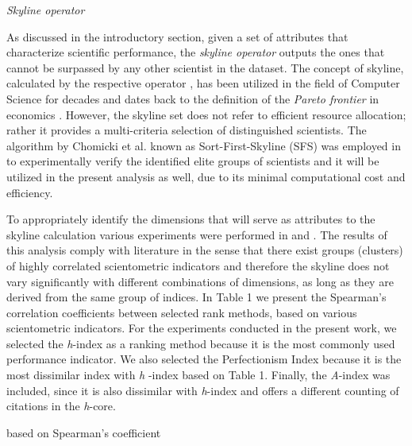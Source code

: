 \emph{Skyline operator }

As discussed in the introductory section, given a set of attributes that
characterize scientific performance, the \emph{skyline operator} outputs
the ones that cannot be surpassed by any other scientist in the dataset.
The concept of skyline, calculated by the respective operator , has been
utilized in the field of Computer Science for decades and dates back to
the definition of the \emph{Pareto frontier} in economics . However, the
skyline set does not refer to efficient resource allocation; rather it
provides a multi-criteria selection of distinguished scientists. The
algorithm by Chomicki et al. known as Sort-First-Skyline (SFS) was
employed in to experimentally verify the identified elite groups of
scientists and it will be utilized in the present analysis as well, due
to its minimal computational cost and efficiency.

To appropriately identify the dimensions that will serve as attributes
to the skyline calculation various experiments were performed in and .
The results of this analysis comply with literature in the sense that
there exist groups (clusters) of highly correlated scientometric
indicators and therefore the skyline does not vary significantly with
different combinations of dimensions, as long as they are derived from
the same group of indices. In Table 1 we present the Spearman's
correlation coefficients between selected rank methods, based on various
scientometric indicators. For the experiments conducted in the present
work, we selected the \emph{h}-index as a ranking method because it is
the most commonly used performance indicator. We also selected the
Perfectio­nism Index because it is the most dissimilar index with
\emph{h} -index based on Table 1. Finally, the \emph{A}-index was
included, since it is also dissimilar with \emph{h}-index and offers a
different counting of citations in the \emph{h}-core.

based on Spearman's coefficient